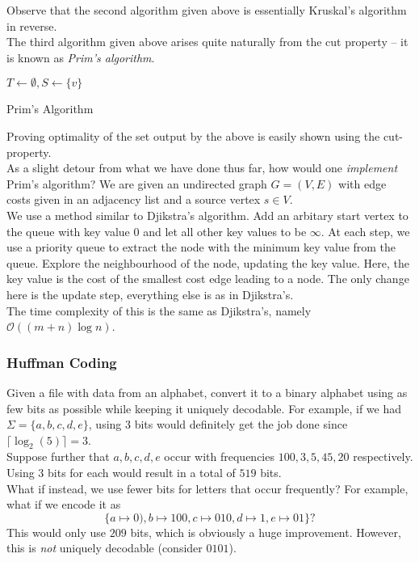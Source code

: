 Observe that the second algorithm given above is essentially Kruskal's algorithm in reverse.\\

The third algorithm given above arises quite naturally from the cut property -- it is known as \textit{Prim's algorithm}.

\begin{algorithm}
	\DontPrintSemicolon
	\SetNoFillComment
	$T\gets\emptyset, S\gets\{v\}$ 
	\caption{Prim's Algorithm}\label{algo: prim's algorithm}
\end{algorithm}

Proving optimality of the set output by the above is easily shown using the cut-property.\\

As a slight detour from what we have done thus far, how would one \textit{implement} Prim's algorithm? We are given an undirected graph $G=(V,E)$ with edge costs given in an adjacency list and a source vertex $s\in V$.\\
We use a method similar to Djikstra's algorithm. Add an arbitary start vertex to the queue with key value $0$ and let all other key values to be $\infty$. At each step, we use a priority queue to extract the node with the minimum key value from the queue. Explore the neighbourhood of the node, updating the key value. Here, the key value is the cost of the smallest cost edge leading to a node. The only change here is the update step, everything else is as in Djikstra's.\\
The time complexity of this is the same as Djikstra's, namely $\mathcal{O}((m+n)\log n)$.

\subsubsection{Huffman Coding}

Given a file with data from an alphabet, convert it to a binary alphabet using as few bits as possible while keeping it uniquely decodable. For example, if we had $\Sigma=\{a,b,c,d,e\}$, using $3$ bits would definitely get the job done since $\lceil \log_2(5)\rceil = 3$.\\
Suppose further that $a,b,c,d,e$ occur with frequencies $100,3,5,45,20$ respectively. Using $3$ bits for each would result in a total of $519$ bits.\\
What if instead, we use fewer bits for letters that occur frequently? For example, what if we encode it as
\[ \{a\mapsto 0),b\mapsto 100,c\mapsto 010,d\mapsto 1,e\mapsto 01\}? \] This would only use $209$ bits, which is obviously a huge improvement. However, this is \textit{not} uniquely decodable (consider $0101$).

